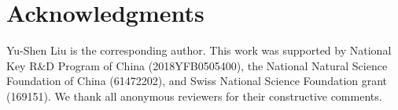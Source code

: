 \documentclass[letterpaper]{article} \usepackage{aaai19}  \usepackage{times}  \usepackage{helvet}  \usepackage{courier}  \usepackage{url}  \usepackage{graphicx}
\begin{document}
\section{Acknowledgments}
Yu-Shen Liu is the corresponding author. This work was supported by National Key R\&D Program of China (2018YFB0505400), the National Natural Science Foundation of China (61472202), and Swiss National Science Foundation grant (169151). We thank all anonymous reviewers for their constructive comments.




\end{document}
